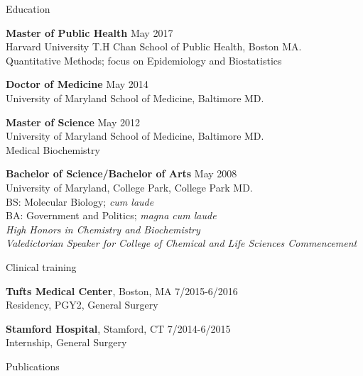 \documentclass{resume} %
\begin{document}
\begin{rSection}{Education}

{\bf Master of Public Health} \hfill {May 2017}
\\ 
Harvard University T.H Chan School of Public Health, Boston MA. 
\\
Quantitative Methods; focus on Epidemiology and Biostatistics  

{\bf Doctor of Medicine} \hfill {May 2014}
\\ 
University of Maryland School of Medicine, Baltimore MD.

{\bf Master of Science} \hfill {May 2012}
\\ 
University of Maryland School of Medicine, Baltimore MD.
\\
Medical Biochemistry

{\bf Bachelor of Science/Bachelor of Arts} \hfill {May 2008}
\\ 
University of Maryland, College Park, College Park MD.
\\
BS: Molecular Biology; \textit{cum laude}\\
BA: Government and Politics; \textit{magna cum laude}\\
\textit{High Honors in Chemistry and Biochemistry}\\
\textit{Valedictorian Speaker for College of Chemical and Life Sciences Commencement}

\end{rSection}
\pagebreak

\begin{rSection}{Clinical training}

{\bf Tufts Medical Center}{, Boston, MA} \hfill {7/2015-6/2016}
\\ 
Residency, PGY2, General Surgery

{\bf Stamford Hospital}{, Stamford, CT} \hfill {7/2014-6/2015}
\\ 
Internship, General Surgery
\end{rSection}



\begin{rSection}{Publications}
\printbibliography[]                  

\begin{refsection}
   \nocite{*}   
   \printbibliography[title={First Authored}]
\end{refsection}

\printbibliography[]  
\begin{refsection}[Coauthors]
   \nocite{*}   
   \printbibliography[title={Co-Authored}]
\end{refsection}
\end{rSection}
\end{document}
